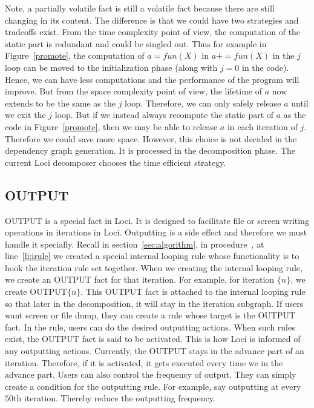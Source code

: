 \documentclass{article}
\begin{document}
Note, a partially volatile fact is still a volatile fact because there
are still changing in its content. The difference is that we could
have two strategies and tradeoffs exist. From the time complexity
point of view, the computation of the static part is redundant and
could be singled out. Thus for example in Figure~\ref{promote}, the
computation of $a=fun(X)$ in $a+=fun(X)$ in the $j$ loop can be moved
to the initialization phase (along with $j=0$ in the code). Hence, we
can have less computations and the performance of the program will
improve. But from the space complexity point of view, the lifetime of
$a$ now extends to be the same as the $j$ loop. Therefore, we can
only safely release $a$ until we exit the $j$ loop. But if we instead
always recompute the static part of $a$ as the code in
Figure~\ref{promote}, then we may be able to release $a$ in each
iteration of $j$. Therefore we could save more space. However, this
choice is not decided in the dependency graph generation. It is
processed in the decomposition phase. The current Loci decomposer
chooses the time efficient strategy. 

\subsection{OUTPUT}
OUTPUT is a special fact in Loci. It is designed to facilitate file or
screen writing operations in iterations in Loci. Outputting is a side
effect and therefore we must handle it specially. Recall in
section~\ref{sec:algorithm}, in procedure~, at
line~\ref{li:irule} we created a special internal looping rule whose
functionality is to hook the iteration rule set together. When we
creating the internal looping rule, we create an OUTPUT fact for that
iteration. For example, for iteration $\{n\}$, we create
OUTPUT$\{n\}$. This OUTPUT fact is attached to the internal looping
rule so that later in the decomposition, it will stay in the iteration
subgraph. If users want screen or file dump, they can create a rule
whose target is the OUTPUT fact. In the rule, users can do the desired
outputting actions. When such rules exist, the OUTPUT fact is said to
be activated. This is how Loci is informed of any outputting actions.
Currently, the OUTPUT stays in the advance part of an
iteration. Therefore, if it is activated, it gets executed every
time we in the advance part. Users can also control the frequency of
output. They can simply create a condition for the outputting
rule. For example, say outputting at every $50$th iteration. Thereby
reduce the outputting frequency. 
\end{document}
